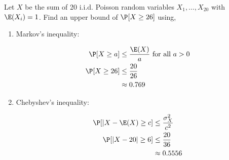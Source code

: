\question Let $X$ be the sum of 20 i.i.d. Poisson random variables $X_1, 
\dotsc, X_{20}$ with $\E(X_i) = 1$. Find an upper bound of $\P[X \geq 26]$ 
using,
\begin{enumerate}[label=(\alph*)]
\item Markov's inequality:
\begin{solution}[3cm]
\begin{equation}
\begin{split}
\P[X \geq a] &\leq \frac{\E(X)}{a} \text{ for all }a > 0 \nonumber \\ \nonumber
\P[X \geq 26] &\leq \frac{20}{26}\\
&\approx 0.769
\end{split}
\end{equation}
\end{solution}

\item Chebyshev's inequality:
\begin{solution}[3cm]
\begin{equation}
\begin{split}
\P[|X - \E(X) \geq c] &\leq \frac{\sigma_X^2}{c^2} \\ \nonumber
\P[|X - 20| \geq 6] &\leq \frac{20}{36} \\
&\approx 0.5556
\end{split}
\end{equation}
\end{solution}



\end{enumerate}